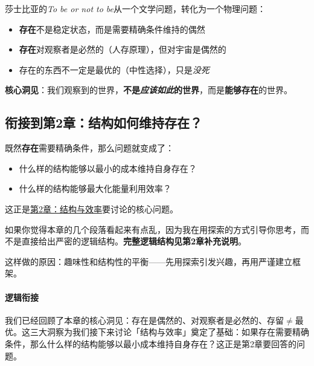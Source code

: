 \documentclass[../main.tex]{subfiles}
\begin{document}
	莎士比亚的\textit{To be or not to be}从一个文学问题，转化为一个物理问题：

	\begin{itemize}
		\item \textbf{存在}不是稳定状态，而是需要精确条件维持的偶然
		\item \textbf{存在}对观察者是必然的（人存原理），但对宇宙是偶然的
		\item 存在的东西不一定是最优的（中性选择），只是\textit{没死}
	\end{itemize}

	\textbf{\huge 核心洞见}：我们观察到的世界，\textbf{不是\textit{应该如此}的世界}，而是\textbf{能够存在}的世界。

	\subsection{衔接到第2章：结构如何维持存在？}

	既然\textbf{存在}需要精确条件，那么问题就变成了：

	\begin{itemize}
		\item 什么样的结构能够以最小的成本维持自身存在？
		\item 什么样的结构能够最大化能量利用效率？
	\end{itemize}

	这正是\hyperref[chap:structure_efficiency]{第2章：结构与效率}要讨论的核心问题。

	\begin{tcolorbox}[colback=blue!5, title=\textit{读者可能的问题}]
		如果你觉得本章的几个段落看起来有点乱，因为我在用探索的方式引导你思考，而不是直接给出严密的逻辑结构。\textbf{完整逻辑结构见第2章补充说明}。

		这样做的原因：趣味性和结构性的平衡——先用探索引发兴趣，再用严谨建立框架。
	\end{tcolorbox}

	\paragraph*{逻辑衔接}
	我们已经回顾了本章的核心洞见：存在是偶然的、对观察者是必然的、存留$\neq$最优。这三大洞察为我们接下来讨论「结构与效率」奠定了基础：如果存在需要精确条件，那么什么样的结构能够以最小成本维持自身存在？这正是第2章要回答的问题。
\end{document}
